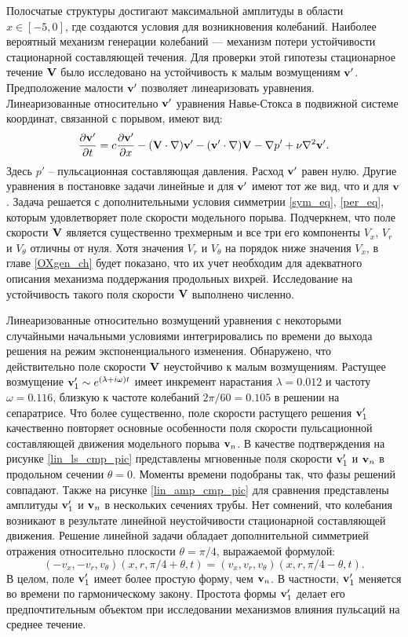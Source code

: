 Полосчатые структуры достигают максимальной амплитуды в области $x\in[-5,0]$, где создаются условия для возникновения колебаний. Наиболее вероятный механизм генерации колебаний --- механизм потери устойчивости стационарной составляющей течения. Для проверки этой гипотезы стационарное течение $\mathbf{V}$ было исследовано на устойчивость к малым возмущениям $\mathbf{v}'$. Предположение малости $\mathbf{v}'$ позволяет линеаризовать уравнения. Линеаризованные относительно $\mathbf{v}'$ уравнения Навье-Стокса в подвижной системе координат, связанной с порывом, имеют вид:
\begin{equation} \label{lin_eq}
\frac{\partial \mathbf{v}'}{\partial t} = c \frac{\partial \mathbf{v}'}{\partial x} - (\mathbf{V} \cdot \nabla) \mathbf{v}' - (\mathbf{v}' \cdot \nabla) \mathbf{V} - \nabla p' + \nu \nabla^2 \mathbf{v}'. 
\end{equation}
Здесь $p'$ -- пульсационная составляющая давления. Расход $\mathbf{v}'$ равен нулю. Другие уравнения в постановке задачи линейные и для $\mathbf{v}'$ имеют тот же вид, что и для $\mathbf{v}$. Задача решается с дополнительными условия симметрии \eqref{sym_eq}, \eqref{per_eq}, которым удовлетворяет поле скорости модельного порыва. Подчеркнем, что поле скорости $\mathbf{V}$ является существенно трехмерным и все три его компоненты $V_x$, $V_r$ и $V_\theta$ отличны от нуля. Хотя значения $V_r$ и $V_\theta$ на порядок ниже значения $V_x$, в главе \ref{OXgen_ch} будет показано, что их учет необходим для адекватного описания механизма поддержания продольных вихрей. Исследование на устойчивость такого поля скорости $\mathbf{V}$ выполнено численно. 

Линеаризованные относительно возмущений уравнения с некоторыми случайными начальными условиями интегрировались по времени до выхода решения на режим экспоненциального изменения. Обнаружено, что действительно поле скорости $\mathbf{V}$ неустойчиво к малым возмущениям. Растущее возмущение $\mathbf{v}'_1 \sim e^{(\lambda+i\omega)t}$ имеет инкремент нарастания $\lambda=0.012$ и частоту $\omega=0.116$, близкую к частоте колебаний $2\pi/60=0.105$ в решении на сепаратрисе. Что более существенно, поле скорости растущего решения $\mathbf{v}'_1$ качественно повторяет основные особенности поля скорости пульсационной составляющей движения модельного порыва $\mathbf{v}_n$. В качестве подтверждения на рисунке \ref{lin_ls_cmp_pic} представлены мгновенные поля скорости $\mathbf{v}'_1$ и $\mathbf{v}_n$ в продольном сечении $\theta = 0$. Моменты времени подобраны так, что фазы решений совпадают. Также на рисунке \ref{lin_amp_cmp_pic} для сравнения представлены амплитуды $\mathbf{v}_1'$ и $\mathbf{v}_n$ в нескольких сечениях трубы. Нет сомнений, что колебания возникают в результате линейной неустойчивости стационарной составляющей движения. Решение линейной задачи обладает дополнительной симметрией отражения относительно плоскости $\theta = \pi/4$, выражаемой формулой:
\begin{equation} \label{dop_sym_eq}
(-v_x, -v_r, v_\theta)(x, r, \pi/4 + \theta, t) = (v_x, v_r, v_\theta)(x, r, \pi/4 - \theta, t). 
\end{equation} 
В целом, поле $\mathbf{v}'_1$ имеет более простую форму, чем $\mathbf{v}_n$. В частности, $\mathbf{v}'_1$ меняется во времени по гармоническому закону. Простота формы $\mathbf{v}'_1$ делает его предпочтительным объектом при исследовании механизмов влияния пульсаций на среднее течение. 


